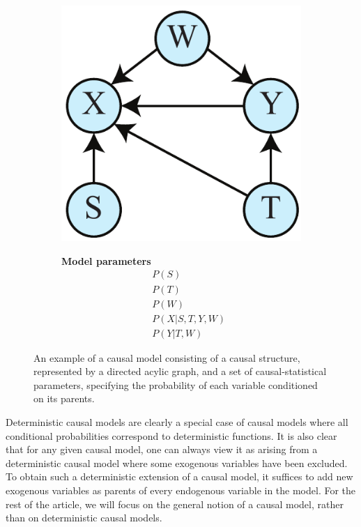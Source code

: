 \documentclass[12pt,onecolumn,nofootinbib]{revtex4-2}
\begin{document}
\begin{figure}[tbp]
	\begin{subfigure}[b]{0.2\textwidth}
		\centering
  		\includegraphics[width=\textwidth]{stab-graph}
	\end{subfigure}
	\quad
	\begin{subfigure}[b]{0.2\textwidth}
		\textbf{Model parameters}
		\begin{eqnarray*}
			&&P(S)\\
			&&P(T)\\
			&&P(W)\\
			&&P(X|S,T,Y,W)\\
			&&P(Y|T,W)
		\end{eqnarray*}
	\end{subfigure}
\caption{An example of a causal model consisting of a causal structure, represented by a directed acylic graph, and a set of causal-statistical parameters, specifying the probability of each variable conditioned on its parents.}
\label{fig:STAB-graph}
\end{figure}

Deterministic causal models are clearly a special case of causal models where all conditional probabilities correspond to deterministic functions. It is also clear that for any given causal model, one can always view it as arising from a deterministic causal model where some exogenous variables have been excluded.  To obtain such a deterministic extension of a causal model, it suffices to add new exogenous variables as parents of every endogenous variable in the model. For the rest of the article, we will focus on the general notion of a causal model, rather than on deterministic causal models.  
\end{document}
